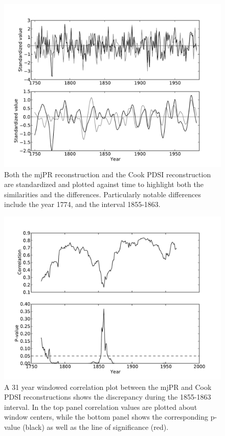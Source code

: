 \begin{figure}
\centering
\includegraphics[width=6in]{figures/reconCompare.pdf}
\caption{Both the mjPR reconstruction and the Cook PDSI reconstruction are standardized and plotted against time to highlight both the similarities and the differences. Particularly notable differences include the year 1774, and the interval 1855-1863.}
\label{fig:reconCompare}
\end{figure}

\begin{figure}
\centering
\includegraphics[width=6in]{figures/reconRunningCorr.pdf}
\caption{A 31 year windowed correlation plot between the mjPR and Cook PDSI reconstructions shows the discrepancy during the 1855-1863 interval. In the top panel correlation values are plotted about window centers, while the bottom panel shows the corresponding p-value (black) as well as the line of significance (red).}
\label{fig:reconRunningCorr}
\end{figure}

